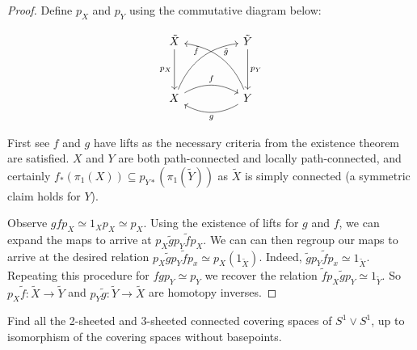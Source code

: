 \documentclass[10pt]{article}
\begin{document}
\begin{proof}

	Define $p_X$ and $p_Y$ using the commutative diagram below:

	\[
\begin{tikzcd}
\tilde{X} \arrow[dd, "p_X"']                                      &  & \tilde{Y} \arrow[dd, "p_Y"]                                         \\
                                                                  &  &                                                                     \\
X \arrow[rr, "f", bend left] \arrow[rruu, "\tilde{f}", bend left] &  & Y \arrow[ll, "g", bend left] \arrow[lluu, "\tilde{g}"', bend right]
\end{tikzcd}
\]

	First see $f$ and $g$ have lifts as the necessary criteria from the existence
	theorem are satisfied. $X$ and $Y$ are both path-connected and
	locally path-connected, and certainly $f_*(\pi_1(X)) \subseteq
	p_{Y*}(\pi_1(\tilde{Y}))$ as $\tilde{X}$ is simply connected (a symmetric
	claim holds for $Y$).

	Observe $gfp_X \simeq 1_Xp_X \simeq p_X$. Using the existence of lifts for $g$ and
	$f$, we can expand the maps to arrive at $p_X\tilde{g}p_Y\tilde{f}p_X$. We
	can can then regroup our maps to arrive at the desired relation
	$p_X\tilde{g}p_Y\tilde{f}p_x \simeq p_X(1_{\tilde{X}})$.  Indeed,
	$\tilde{g}p_Y\tilde{f}p_x \simeq 1_{\tilde{X}}$. Repeating this procedure for
	$fgp_Y \simeq p_Y$ we recover the relation $\tilde{f}p_X\tilde{g}p_Y \simeq
	1_{\tilde{Y}}$. So $p_X\tilde{f}: \tilde{X} \to \tilde{Y}$ and $p_Y\tilde{g}:
	\tilde{Y} \to \tilde{X}$ are homotopy inverses.
\end{proof}


\begin{exercise}
	Find all the 2-sheeted and 3-sheeted connected covering spaces of $S^1 \vee
	S^1$, up to isomorphism of the covering spaces without basepoints.
\end{exercise}
\end{document}
